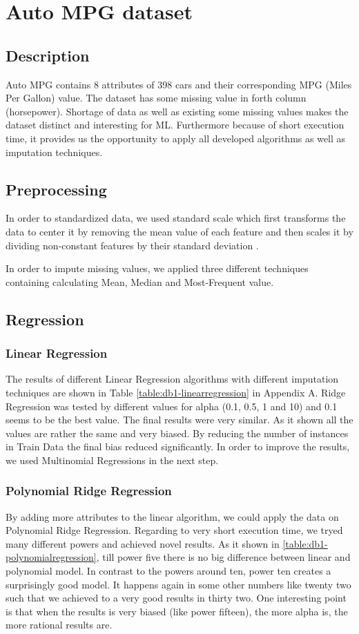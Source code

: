 \section{Auto MPG dataset}
\subsection{Description}
Auto MPG contains 8 attributes of 398 cars  and their corresponding MPG (Miles Per Gallon) value. The dataset has some missing value in forth column (horsepower). Shortage of data as well as existing some missing values makes the dataset distinct and interesting for ML. Furthermore because of short execution time, it provides us the opportunity to apply all developed algorithms as well as imputation techniques.

\subsection{Preprocessing}
In order to standardized data, we used standard scale which first transforms the data to center it by removing the mean value of each feature and then scales it by dividing non-constant features by their standard deviation \cite{scikitstandardization}.

In order to impute missing values, we applied three different techniques containing calculating Mean, Median and Most-Frequent value.

\subsection{Regression}
\subsubsection{Linear Regression}
The results of different Linear Regression algorithms with different imputation techniques are shown in Table \ref{table:db1-linearregression} in Appendix A. Ridge Regression was tested by different values for alpha (0.1, 0.5, 1 and 10) and 0.1 seems to be the best value. The final results were very similar. As it shown all the values are rather the same and very biased. By reducing the number of instances in Train Data the final bias reduced significantly. In order to improve the results, we used Multinomial Regressions in the next step.

\subsubsection{Polynomial Ridge Regression}
By adding more attributes to the linear algorithm, we could apply the data on Polynomial Ridge Regression. Regarding to very short execution time, we tryed many different powers and achieved novel results. As it shown in \ref{table:db1-polynomialregression}, till power five there is no big difference between linear and polynomial model. In contrast to the powers around ten, power ten creates a surprisingly good model. It happens again in some other numbers like twenty two such that we achieved to a very good results in thirty two. One interesting point is that when the results is very biased (like power fifteen), the more alpha is, the more rational results are.


